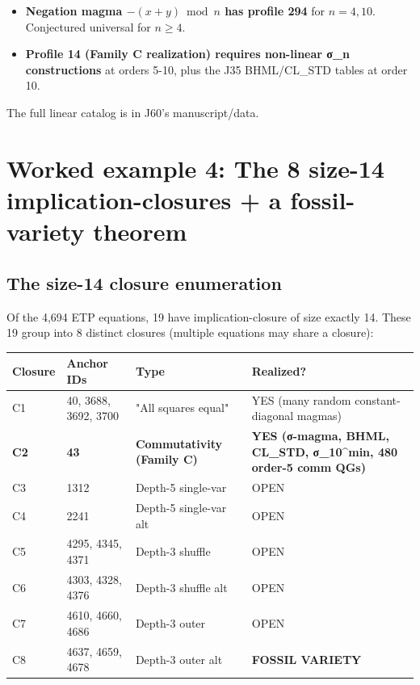 \documentclass[11pt,reqno]{amsart}
\theoremstyle{plain}
\theoremstyle{definition}
\begin{document}
\begin{itemize}
\item \textbf{Negation magma $-(x + y) \bmod n$ has profile 294} for $n = 4, 10$. Conjectured universal for $n \geq 4$.
\end{itemize}

\begin{itemize}
\item \textbf{Profile 14 (Family C realization) requires non-linear σ_n constructions} at orders 5-10, plus the J35 BHML/CL_STD tables at order 10.
\end{itemize}

The full linear catalog is in J60's manuscript/data.

\section{Worked example 4: The 8 size-14 implication-closures + a fossil-variety theorem}

\subsection{The size-14 closure enumeration}

Of the 4,694 ETP equations, 19 have implication-closure of size exactly 14. These 19 group into 8 distinct closures (multiple equations may share a closure):

\begin{center}
\begin{tabular}{llll}
\toprule
Closure & Anchor IDs & Type & Realized? \\
\midrule
C1 & 40, 3688, 3692, 3700 & "All squares equal" & YES (many random constant-diagonal magmas) \\
\textbf{C2} & \textbf{43} & \textbf{Commutativity (Family C)} & \textbf{YES (σ-magma, BHML, CL_STD, σ_10^min, 480 order-5 comm QGs)} \\
C3 & 1312 & Depth-5 single-var & OPEN \\
C4 & 2241 & Depth-5 single-var alt & OPEN \\
C5 & 4295, 4345, 4371 & Depth-3 shuffle & OPEN \\
C6 & 4303, 4328, 4376 & Depth-3 shuffle alt & OPEN \\
C7 & 4610, 4660, 4686 & Depth-3 outer & OPEN \\
C8 & 4637, 4659, 4678 & Depth-3 outer alt & \textbf{FOSSIL VARIETY} \\
\bottomrule
\end{tabular}
\end{center}
\end{document}
